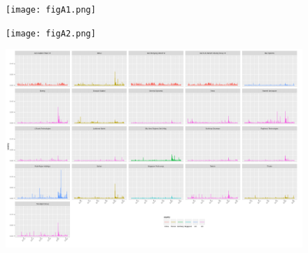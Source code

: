 \documentclass[
  letterpaper,
  DIV=11,
  numbers=noendperiod]{scrartcl}
\begin{document}
\begin{figure}
\centering
  \texttt{[image: figA1.png]}
\end{figure}

\begin{figure}
\centering
  \texttt{[image: figA2.png]}
\end{figure}

\begin{figure}
\centering
  \includegraphics{figA3.png}
\end{figure}
\end{document}

